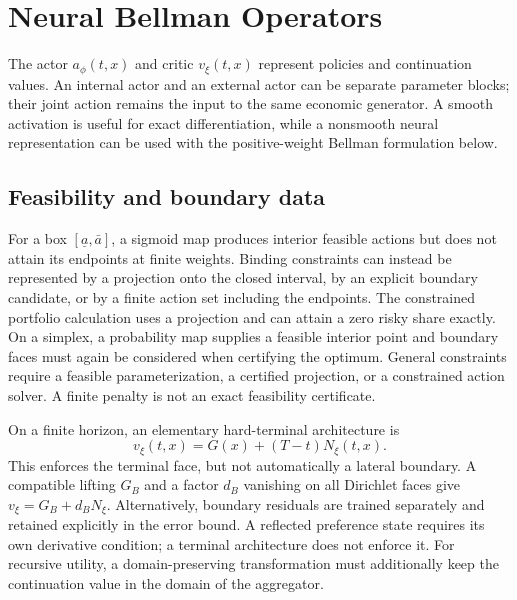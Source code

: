 \section{Neural Bellman Operators}\label{sec:method}
The actor $a_\phi(t,x)$ and critic $v_\xi(t,x)$ represent policies and continuation values. An internal actor and an external actor can be separate parameter blocks; their joint action remains the input to the same economic generator. A smooth activation is useful for exact differentiation, while a nonsmooth neural representation can be used with the positive-weight Bellman formulation below.

\subsection{Feasibility and boundary data}
For a box $[\underline a,\bar a]$, a sigmoid map produces interior feasible actions but does not attain its endpoints at finite weights. Binding constraints can instead be represented by a projection onto the closed interval, by an explicit boundary candidate, or by a finite action set including the endpoints. The constrained portfolio calculation uses a projection and can attain a zero risky share exactly. On a simplex, a probability map supplies a feasible interior point and boundary faces must again be considered when certifying the optimum. General constraints require a feasible parameterization, a certified projection, or a constrained action solver. A finite penalty is not an exact feasibility certificate.

On a finite horizon, an elementary hard-terminal architecture is
\begin{equation}\label{eq:terminal}
 v_\xi(t,x)=G(x)+(T-t)N_\xi(t,x).
\end{equation}
This enforces the terminal face, but not automatically a lateral boundary. A compatible lifting $G_B$ and a factor $d_B$ vanishing on all Dirichlet faces give $v_\xi=G_B+d_BN_\xi$. Alternatively, boundary residuals are trained separately and retained explicitly in the error bound. A reflected preference state requires its own derivative condition; a terminal architecture does not enforce it. For recursive utility, a domain-preserving transformation must additionally keep the continuation value in the domain of the aggregator.

